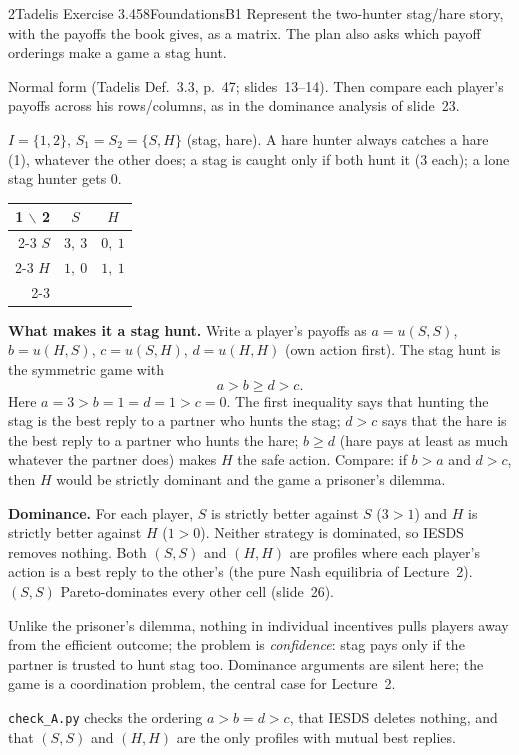 \begin{exsol}{2}{Tadelis Exercise 3.4}{58}{Foundations}{B1}
\asked Represent the two-hunter stag/hare story, with the payoffs the book gives, as a matrix.
The plan also asks which payoff orderings make a game a stag hunt.

\method Normal form (Tadelis Def.~3.3, p.~47; slides~13--14). Then compare each player's
payoffs across his rows/columns, as in the dominance analysis of slide~23.

\solution
$I = \{1, 2\}$, $S_1 = S_2 = \{S, H\}$ (stag, hare). A hare hunter always catches a hare (1),
whatever the other does; a stag is caught only if both hunt it (3 each); a lone stag hunter gets 0.
\begin{center}
\begin{tabular}{r|c|c|}
\multicolumn{1}{r}{1 $\backslash$ 2} & \multicolumn{1}{c}{$S$} & \multicolumn{1}{c}{$H$}\\ \cline{2-3}
$S$ & $3,\ 3$ & $0,\ 1$ \\ \cline{2-3}
$H$ & $1,\ 0$ & $1,\ 1$ \\ \cline{2-3}
\end{tabular}
\end{center}

\textbf{What makes it a stag hunt.} Write a player's payoffs as $a = u(S,S)$, $b = u(H,S)$,
$c = u(S,H)$, $d = u(H,H)$ (own action first). The stag hunt is the symmetric game with
\[
  a > b \ge d > c .
\]
Here $a = 3 > b = 1 = d = 1 > c = 0$. The first inequality says that hunting the stag is the best
reply to a partner who hunts the stag; $d > c$ says that the hare is the best reply to a partner
who hunts the hare; $b \ge d$ (hare pays at least as much whatever the partner does) makes $H$
the safe action. Compare: if $b > a$ and $d > c$, then $H$ would be strictly dominant and the
game a prisoner's dilemma.

\textbf{Dominance.} For each player, $S$ is strictly better against $S$ ($3 > 1$) and $H$ is
strictly better against $H$ ($1 > 0$). Neither strategy is dominated, so IESDS removes nothing.
Both $(S,S)$ and $(H,H)$ are profiles where each player's action is a best reply to the other's
(the pure Nash equilibria of Lecture~2). $(S,S)$ Pareto-dominates every other cell (slide~26).

\interp Unlike the prisoner's dilemma, nothing in individual incentives pulls players away from
the efficient outcome; the problem is \emph{confidence}: stag pays only if the partner is
trusted to hunt stag too. Dominance arguments are silent here; the game is a coordination
problem, the central case for Lecture~2.

\verify \texttt{check\_A.py} checks the ordering $a > b = d > c$, that IESDS deletes nothing,
and that $(S,S)$ and $(H,H)$ are the only profiles with mutual best replies.

\end{exsol}
